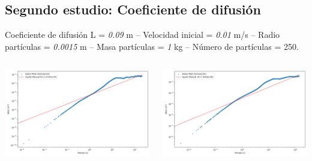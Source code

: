 \documentclass{beamer}
\begin{document}
\subsection{Segundo estudio: Coeficiente de difusión}
\begin{frame}{Coeficiente de difusión}
  \tiny {} L = \textit{0.09} m -- Velocidad inicial = \textit{0.01} m/s -- Radio partículas = \textit{0.0015} m -- Masa partículas = \textit{1} kg -- Número de partículas = 250.
  \begin{columns}
    \begin{column}{0.50\textwidth}
      \includegraphics[width=1.10\linewidth]{photoMaterial/MSD_09.png}
    \end{column}
    \begin{column}{0.50\textwidth}
      \includegraphics[width=1.10\linewidth]{photoMaterial/MSD_03.png}
    \end{column}
  \end{columns}
\end{frame}
\end{document}
